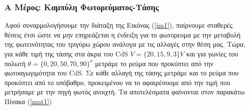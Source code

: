 \documentclass[a4paper]{article}
\begin{document}
	\subsubsection*{Α Μέρος: Καμπύλη Φωτορεύματος-Τάσης}
		Αφού συναρμολογήσουμε την διάταξη της Εικόνας (\ref{im1}), παίρνουμε σταθερές θέσεις έτσι ώστε να μην επηρεάζεται η ένδειξη για το φωτορευμα με την μεταβολή της φωτεινότητας του τριγύρω χώρου ανάλογα με τις αλλαγές στην θέση μας. Τώρα, για κάθε τιμή της τάσης στα άκρα του CdS $V=\{20,15,9,3\}V$ και για γωνίες του πολωτή $\theta=\{0,20,50,70,90\}^o$ μετράμε το ρεύμα που προκύπτει από την φωτοαγωγιμότητα του CdS. Σε κάθε αλλαγή της τάσης μετράμε και το ρεύμα που προκύπτει από το υπόβαθρο, προκειμένου να το αφαιρέσουμε από την τιμή που μετρήσαμε με την πηγή φωτός ανοιχτή. Τα αποτελέσματα φαίνονται στον παρακάτω Πίνακα (\ref{mat1})
		
%     
%			
\end{document}
